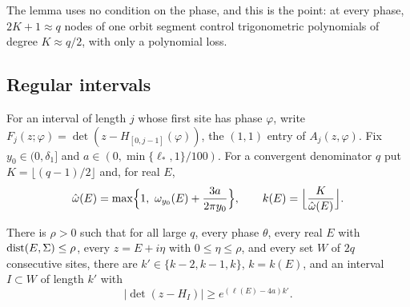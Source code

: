 The lemma uses no condition on the phase, and this is the point: at every phase, $2K+1\approx q$ nodes of one orbit segment control trigonometric polynomials of degree $K\approx q/2$, with only a polynomial loss.

\subsection{Regular intervals}

For an interval of length $j$ whose first site has phase $\varphi$, write $F_j(z;\varphi)=\det(z-H_{[0,j-1]}(\varphi))$, the $(1,1)$ entry of $A_j(z,\varphi)$. Fix $y_0\in(0,\delta_1]$ and $a\in(0,\min\{\ell_*,1\}/100)$. For a convergent denominator $q$ put $K=\lfloor(q-1)/2\rfloor$ and, for real $E$,
\[
\omh(E)=\max\Bigl\{1,\ \om_{y_0}(E)+\frac{3a}{2\pi y_0}\Bigr\},\qquad k(E)=\Bigl\lfloor\frac K{\omh(E)}\Bigr\rfloor .
\]

\begin{lemma}\label{lem:RN}
There is $\rho>0$ such that for all large $q$, every phase $\theta$, every real $E$ with $\operatorname{dist}(E,\Sigma)\le\rho$, every $z=E+i\eta$ with $0\le\eta\le\rho$, and every set $W$ of $2q$ consecutive sites, there are $k'\in\{k-2,k-1,k\}$, $k=k(E)$, and an interval $I\subset W$ of length $k'$ with
\[
|\det(z-H_I)|\ge e^{(\ell(E)-4a)k'}.
\]
\end{lemma}

